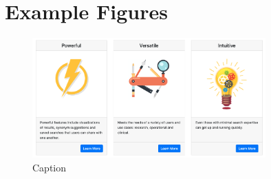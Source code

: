 
\chapter{Example Figures}


\begin{figure}
    \centering
    \includegraphics[width=0.8\textwidth]{Resources/Images/Banner4.png}
    \caption{Caption}
    \label{fig:my_label}
\end{figure}

